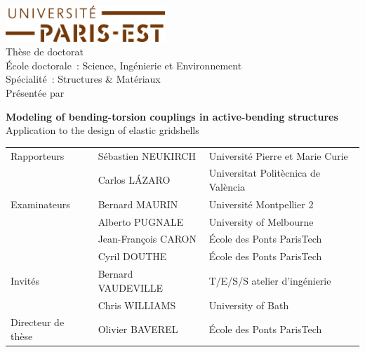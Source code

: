 \begin{titlepage}
\begin{center}

\includegraphics[width=6cm]{head/logo_upe}\\
\vspace{2cm}
{\Large Thèse de doctorat} \\
{\large École doctorale~: Science, Ingénierie et Environnement}\\
{\large Spécialité~: Structures \& Matériaux}\\
\vspace{18pt}
{\Large Présentée par}\\
{\large \myauthor}

\vfill

{\ttfamily
{\bfseries\huge  Modeling of bending-torsion couplings in active-bending structures}
\\\vspace{12pt}
{\Large Application to the design of elastic gridshells}
}

\vfill

{\setlength{\tabcolsep}{0.5cm}
\begin{tabular}{@{}>{}lll@{}}

Rapporteurs 		& Sébastien NEUKIRCH 		& Université Pierre et Marie Curie\\
 				& Carlos LÁZARO 			& Universitat Politècnica de València\\
\addlinespace
Examinateurs		& Bernard MAURIN 			& Université Montpellier 2\\
 				& Alberto PUGNALE 		& University of Melbourne\\
 				& Jean-François CARON 		& École des Ponts ParisTech\\
 				& Cyril DOUTHE 			& École des Ponts ParisTech\\
\addlinespace
Invités 			& Bernard VAUDEVILLE 		& T/E/S/S atelier d'ingénierie\\
 				& Chris WILLIAMS 			& University of Bath\\
\addlinespace
Directeur de thèse 	& Olivier BAVEREL 			& École des Ponts ParisTech\\
\end{tabular}}

\end{center}
\end{titlepage}



